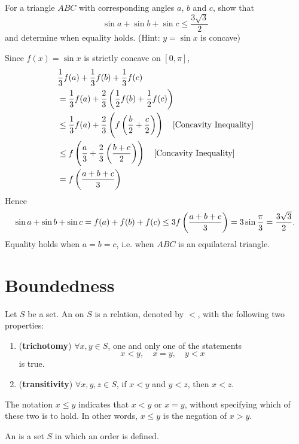 \begin{exercise}{}{}
For a triangle $ABC$ with corresponding angles $a$, $b$ and $c$, show that
\[ \sin a+\sin b+\sin c\le\frac{3\sqrt{3}}{2} \]
and determine when equality holds. (Hint: $y=\sin x$ is concave)
\end{exercise}

\begin{solution}
Since $f(x)=\sin x$ is strictly concave on $[0,\pi]$,
\begin{align*}
&\frac{1}{3}f(a)+\frac{1}{3}f(b)+\frac{1}{3}f(c) \\
&= \frac{1}{3}f(a)+\frac{2}{3}\left(\frac{1}{2}f(b)+\frac{1}{2}f(c)\right) \\
&\le \frac{1}{3}f(a)+\frac{2}{3}\left(f\left(\frac{b}{2}+\frac{c}{2}\right)\right) \quad \text{[Concavity Inequality]} \\
&\le f\left(\frac{a}{3}+\frac{2}{3}\left(\frac{b+c}{2}\right)\right) \quad \text{[Concavity Inequality]} \\
&= f\left(\frac{a+b+c}{3}\right)
\end{align*}
Hence 
\[ \sin a+\sin b+\sin c=f(a)+f(b)+f(c)\le3f\left(\frac{a+b+c}{3}\right)=3\sin\frac{\pi}{3}=\frac{3\sqrt{3}}{2}. \]
Equality holds when $a=b=c$, i.e. when $ABC$ is an equilateral triangle.
\end{solution}
\pagebreak

\section{Boundedness}
\begin{definition}
Let $S$ be a set. An  on $S$ is a relation, denoted by $<$, with the following two properties:
\begin{enumerate}[label=(\roman*)]
\item (\textbf{trichotomy}) $\forall x,y \in S$, one and only one of the statements
\[ x<y, \quad x=y, \quad y<x \]
is true.
\item (\textbf{transitivity}) $\forall x,y,z \in S$, if $x<y$ and $y<z$, then $x<z$.
\end{enumerate}
\end{definition}

\begin{notation}
The notation $x \le y$ indicates that $x<y$ or $x = y$, without specifying which of these two is to hold. In other words, $x\le y$ is the negation of $x>y$.
\end{notation}

\begin{definition}
An  is a set $S$ in which an order is defined.
\end{definition}

